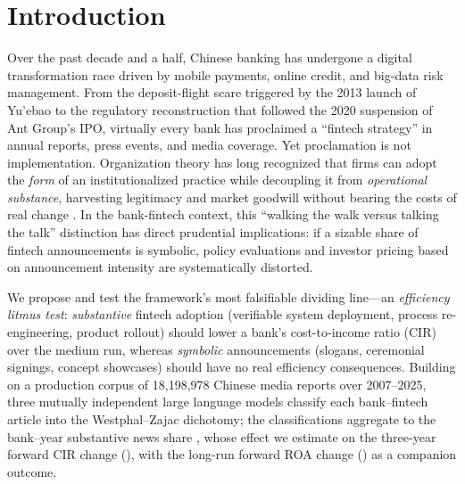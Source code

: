 \section{Introduction}\label{sec:intro}

Over the past decade and a half, Chinese banking has undergone a digital
transformation race driven by mobile payments, online credit, and big-data risk
management. From the deposit-flight scare triggered by the 2013 launch of
Yu'ebao to the regulatory reconstruction that followed the 2020 suspension of
Ant Group's IPO, virtually every bank has proclaimed a ``fintech strategy'' in
annual reports, press events, and media coverage. Yet proclamation is not
implementation. Organization theory has long recognized that firms can adopt
the \emph{form} of an institutionalized practice while decoupling it from
\emph{operational substance}, harvesting legitimacy and market goodwill without
bearing the costs of real change
\parencite{westphal1998sym,westphal2001decoupling}. In the bank-fintech
context, this ``walking the walk versus talking the talk'' distinction has
direct prudential implications: if a sizable share of fintech announcements is
symbolic, policy evaluations and investor pricing based on announcement
intensity are systematically distorted.

We propose and test the framework's most falsifiable dividing line---an
\emph{efficiency litmus test}: \emph{substantive} fintech adoption (verifiable
system deployment, process re-engineering, product rollout) should lower a
bank's cost-to-income ratio (CIR) over the medium run, whereas \emph{symbolic}
announcements (slogans, ceremonial signings, concept showcases) should have no
real efficiency consequences. Building on a production corpus of
18{,}198{,}978 Chinese media reports over 2007--2025, three mutually independent
large language models classify each bank--fintech article into the
Westphal--Zajac dichotomy; the classifications aggregate to the bank--year
substantive news share , whose effect we estimate on the
three-year forward CIR change (), with
the long-run forward ROA change () as a
companion outcome.

